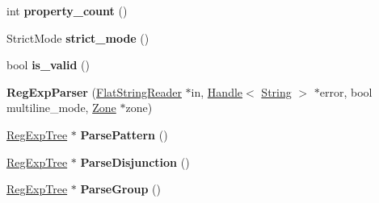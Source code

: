 \begin{DoxyCompactItemize}
\item 
\hypertarget{classv8_1_1internal_1_1_b_a_s_e___e_m_b_e_d_d_e_d_a3166e5d450946a453ff9ba16be0af570}{}int {\bfseries property\+\_\+count} ()\label{classv8_1_1internal_1_1_b_a_s_e___e_m_b_e_d_d_e_d_a3166e5d450946a453ff9ba16be0af570}

\item 
\hypertarget{classv8_1_1internal_1_1_b_a_s_e___e_m_b_e_d_d_e_d_a9ee96e9fc69a4495f080eda2defdd8be}{}Strict\+Mode {\bfseries strict\+\_\+mode} ()\label{classv8_1_1internal_1_1_b_a_s_e___e_m_b_e_d_d_e_d_a9ee96e9fc69a4495f080eda2defdd8be}

\item 
\hypertarget{classv8_1_1internal_1_1_b_a_s_e___e_m_b_e_d_d_e_d_ab016c3bc38fe6f894798b65dd14e281a}{}bool {\bfseries is\+\_\+valid} ()\label{classv8_1_1internal_1_1_b_a_s_e___e_m_b_e_d_d_e_d_ab016c3bc38fe6f894798b65dd14e281a}

\item 
\hypertarget{classv8_1_1internal_1_1_b_a_s_e___e_m_b_e_d_d_e_d_a1d959be6ff2be208b736bc1c327e93aa}{}{\bfseries Reg\+Exp\+Parser} (\hyperlink{classv8_1_1internal_1_1_flat_string_reader}{Flat\+String\+Reader} $\ast$in, \hyperlink{classv8_1_1internal_1_1_handle}{Handle}$<$ \hyperlink{classv8_1_1internal_1_1_string}{String} $>$ $\ast$error, bool multiline\+\_\+mode, \hyperlink{classv8_1_1internal_1_1_zone}{Zone} $\ast$zone)\label{classv8_1_1internal_1_1_b_a_s_e___e_m_b_e_d_d_e_d_a1d959be6ff2be208b736bc1c327e93aa}

\item 
\hypertarget{classv8_1_1internal_1_1_b_a_s_e___e_m_b_e_d_d_e_d_a4afe8cc429332894c8a8c86c5a2bea10}{}\hyperlink{classv8_1_1internal_1_1_reg_exp_tree}{Reg\+Exp\+Tree} $\ast$ {\bfseries Parse\+Pattern} ()\label{classv8_1_1internal_1_1_b_a_s_e___e_m_b_e_d_d_e_d_a4afe8cc429332894c8a8c86c5a2bea10}

\item 
\hypertarget{classv8_1_1internal_1_1_b_a_s_e___e_m_b_e_d_d_e_d_a5f59f2f94c8bc3cc713ec96189596576}{}\hyperlink{classv8_1_1internal_1_1_reg_exp_tree}{Reg\+Exp\+Tree} $\ast$ {\bfseries Parse\+Disjunction} ()\label{classv8_1_1internal_1_1_b_a_s_e___e_m_b_e_d_d_e_d_a5f59f2f94c8bc3cc713ec96189596576}

\item 
\hypertarget{classv8_1_1internal_1_1_b_a_s_e___e_m_b_e_d_d_e_d_a8999b77f02fced28e3a7f76ac240d0aa}{}\hyperlink{classv8_1_1internal_1_1_reg_exp_tree}{Reg\+Exp\+Tree} $\ast$ {\bfseries Parse\+Group} ()\label{classv8_1_1internal_1_1_b_a_s_e___e_m_b_e_d_d_e_d_a8999b77f02fced28e3a7f76ac240d0aa}


\end{DoxyCompactItemize}
